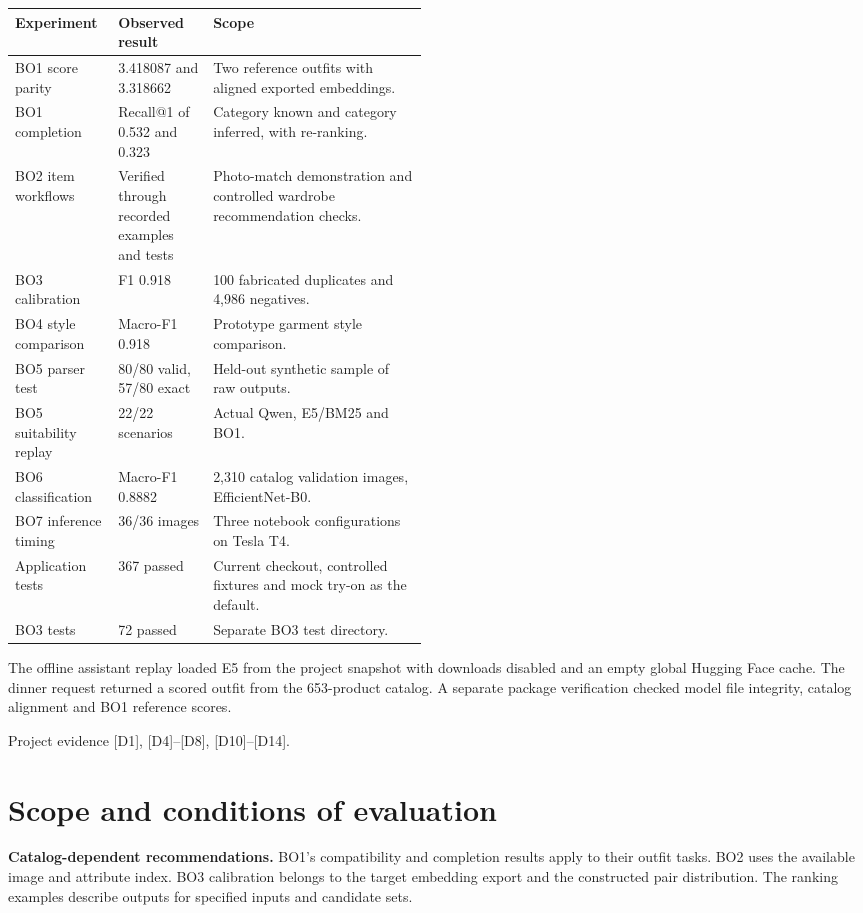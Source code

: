\documentclass[11pt,a4paper]{article}
\newcommand{\src}[1]{\par{\footnotesize\textcolor{muted}{Project evidence #1.}}\par}
\begin{document}
\begin{tabularx}{\linewidth}{@{}L{0.25\linewidth}L{0.23\linewidth}Y@{}}
\toprule
\textbf{Experiment} & \textbf{Observed result} & \textbf{Scope} \\
\midrule
BO1 score parity & 3.418087 and 3.318662 & Two reference outfits with aligned exported embeddings. \\
BO1 completion & Recall@1 of 0.532 and 0.323 & Category known and category inferred, with re-ranking. \\
BO2 item workflows & Verified through recorded examples and tests & Photo-match demonstration and controlled wardrobe recommendation checks. \\
BO3 calibration & F1 0.918 & 100 fabricated duplicates and 4,986 negatives. \\
BO4 style comparison & Macro-F1 0.918 & Prototype garment style comparison. \\
BO5 parser test & 80/80 valid, 57/80 exact & Held-out synthetic sample of raw outputs. \\
BO5 suitability replay & 22/22 scenarios & Actual Qwen, E5/BM25 and BO1. \\
BO6 classification & Macro-F1 0.8882 & 2,310 catalog validation images, EfficientNet-B0. \\
BO7 inference timing & 36/36 images & Three notebook configurations on Tesla T4. \\
Application tests & 367 passed & Current checkout, controlled fixtures and mock try-on as the default. \\
BO3 tests & 72 passed & Separate BO3 test directory. \\
\bottomrule
\end{tabularx}

The offline assistant replay loaded E5 from the project snapshot with downloads disabled and an empty global Hugging Face cache. The dinner request returned a scored outfit from the 653-product catalog. A separate package verification checked model file integrity, catalog alignment and BO1 reference scores.
\src{[D1], [D4]--[D8], [D10]--[D14]}

\clearpage
\section{Scope and conditions of evaluation}
\textbf{Catalog-dependent recommendations.} BO1's compatibility and completion results apply to their outfit tasks. BO2 uses the available image and attribute index. BO3 calibration belongs to the target embedding export and the constructed pair distribution. The ranking examples describe outputs for specified inputs and candidate sets.
\end{document}
